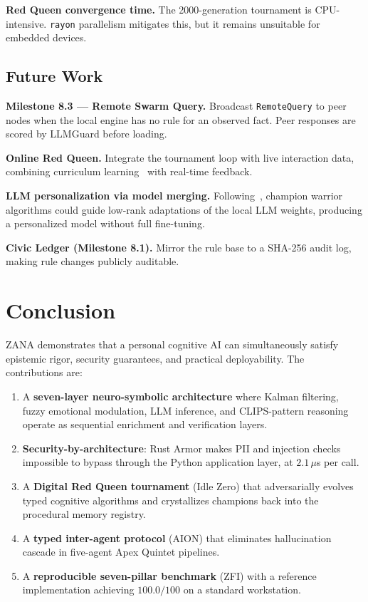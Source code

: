\documentclass[12pt,a4paper]{article}
\begin{document}
\textbf{Red Queen convergence time.} The 2000-generation tournament is CPU-intensive. \texttt{rayon}
parallelism mitigates this, but it remains unsuitable for embedded devices.

\subsection{Future Work}
\label{sec:future}

\textbf{Milestone 8.3 --- Remote Swarm Query.} Broadcast \texttt{RemoteQuery} to peer nodes when the
local engine has no rule for an observed fact. Peer responses are scored by LLMGuard before loading.

\textbf{Online Red Queen.} Integrate the tournament loop with live interaction data, combining
curriculum learning~\cite{bengio2009curriculum} with real-time feedback.

\textbf{LLM personalization via model merging.} Following~\cite{akiba2024modelmerging}, champion
warrior algorithms could guide low-rank adaptations of the local LLM weights, producing a
personalized model without full fine-tuning.

\textbf{Civic Ledger (Milestone 8.1).} Mirror the rule base to a SHA-256 audit log, making rule
changes publicly auditable.

\section{Conclusion}

ZANA demonstrates that a personal cognitive AI can simultaneously satisfy epistemic rigor, security
guarantees, and practical deployability. The contributions are:

\begin{enumerate}[leftmargin=*, label=\arabic*.]
  \item A \textbf{seven-layer neuro-symbolic architecture} where Kalman filtering, fuzzy emotional
    modulation, LLM inference, and CLIPS-pattern reasoning operate as sequential enrichment and
    verification layers.
  \item \textbf{Security-by-architecture}: Rust Armor makes PII and injection checks impossible to
    bypass through the Python application layer, at $2.1\,\mu$s per call.
  \item A \textbf{Digital Red Queen tournament} (Idle Zero) that adversarially evolves typed cognitive
    algorithms and crystallizes champions back into the procedural memory registry.
  \item A \textbf{typed inter-agent protocol} (AION) that eliminates hallucination cascade in
    five-agent Apex Quintet pipelines.
  \item A \textbf{reproducible seven-pillar benchmark} (ZFI) with a reference implementation
    achieving $100.0/100$ on a standard workstation.
\end{enumerate}
\end{document}
